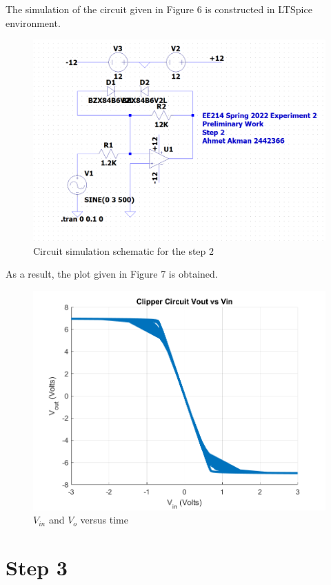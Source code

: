 \documentclass[letterpaper,12pt]{article}
\begin{document}
The simulation of the circuit given in Figure 6 is constructed in LTSpice environment.
\begin{figure}[H]
    \centering
    \includegraphics[width=1\textwidth]{2Sim.png}
\caption{Circuit simulation schematic  for the step 2}
\end{figure} 
As a result, the plot given in Figure 7 is obtained.
\begin{figure}[H]
    \centering
    \includegraphics[width=1\textwidth]{2.png}
\caption{\(V_{in}\) and \(V_o\) versus time} 
\end{figure}  

\section{Step 3}
\end{document}

